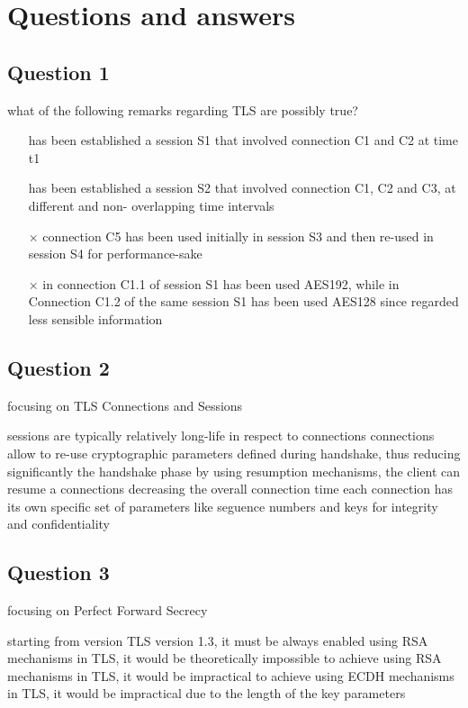 \section{Questions and answers}
\subsection*{Question 1}

what of the following remarks regarding TLS are possibly true?
\begin{itemize}
  \item[\checkmark] has been established a session S1 that involved
    connection C1 and C2 at time t1
  \item[\checkmark] has been established a session S2 that involved
    connection C1, C2 and C3, at different and non- overlapping time
    intervals
  \item[$\times$] connection C5 has been used initially in session S3
    and then re-used in session S4 for performance-sake
  \item[$\times$] in connection C1.1 of session S1 has been used
    AES192, while in Connection C1.2 of the same session S1 has been
    used AES128 since regarded less sensible information
\end{itemize}

\subsection*{Question 2}
focusing on TLS Connections and Sessions
\begin{itemize}
  \correct sessions are typically relatively long-life in respect to
  connections
  \incorrect connections allow to re-use cryptographic parameters
  defined during handshake, thus reducing significantly the handshake
  phase
  \incorrect by using resumption mechanisms, the client can resume a
  connections decreasing the overall connection time
  \correct each connection has its own specific set of parameters like
  seguence numbers and keys for integrity and confidentiality
\end{itemize}
\subsection*{Question 3}
focusing on Perfect Forward Secrecy
\begin{itemize}
  \correct starting from version TLS version 1.3, it must be always
  enabled
  \incorrect using RSA mechanisms in TLS, it would be theoretically
  impossible to achieve
  \correct using RSA mechanisms in TLS, it would be impractical to
  achieve
  \incorrect using ECDH mechanisms in TLS, it would be impractical due
  to the length of the key parameters
\end{itemize}
